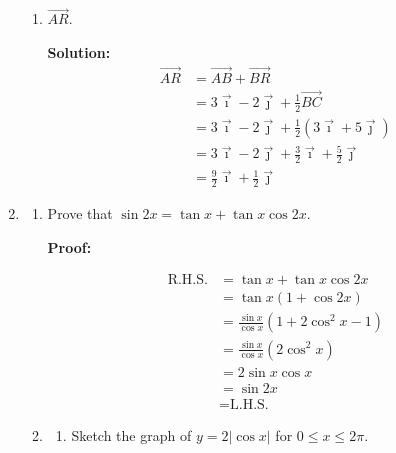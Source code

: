 \documentclass{report}
\newcommand{\sol}{\textbf{Solution:}}
\newcommand{\proof}{\textbf{Proof:}}
\begin{document}
\begin{enumerate}[leftmargin=*]
\begin{enumerate}
              \item $\overrightarrow{A R}$.

                    \sol{}
                    \begin{align*}
                        \overrightarrow{A R} & = \overrightarrow{AB} + \overrightarrow{BR}                                       \\
                                             & = 3\vec{\imath}-2\vec{\jmath} + \frac{1}{2} \overrightarrow{B C}                  \\
                                             & = 3\vec{\imath}-2\vec{\jmath} + \frac{1}{2} (3\vec{\imath} + 5\vec{\jmath})       \\
                                             & = 3\vec{\imath}-2\vec{\jmath} + \frac{3}{2}\vec{\imath} + \frac{5}{2}\vec{\jmath} \\
                                             & = \frac{9}{2}\vec{\imath} + \frac{1}{2}\vec{\jmath}
                    \end{align*}
          \end{enumerate}

    \item \begin{enumerate}
              \item Prove that $\sin 2 x=\tan x+\tan x \cos 2 x$.

                    \proof{}

                    \begin{align*}
                        \text{R.H.S.} & = \tan x + \tan x \cos 2 x                  \\
                                      & = \tan x(1 + \cos 2 x)                      \\
                                      & = \frac{\sin x}{\cos x}(1 + 2 \cos^2 x - 1) \\
                                      & = \frac{\sin x}{\cos x}(2 \cos^2 x)         \\
                                      & = 2 \sin x \cos x                           \\
                                      & = \sin 2x                                   \\
                                      & = \text{L.H.S.}
                    \end{align*}

                    \newpage
              \item \begin{enumerate}
                        \item Sketch the graph of $y=2|\cos x|$ for $0 \leqslant x \leqslant 2 \pi$.


\end{enumerate}
\end{enumerate}
\end{enumerate}
\end{document}

